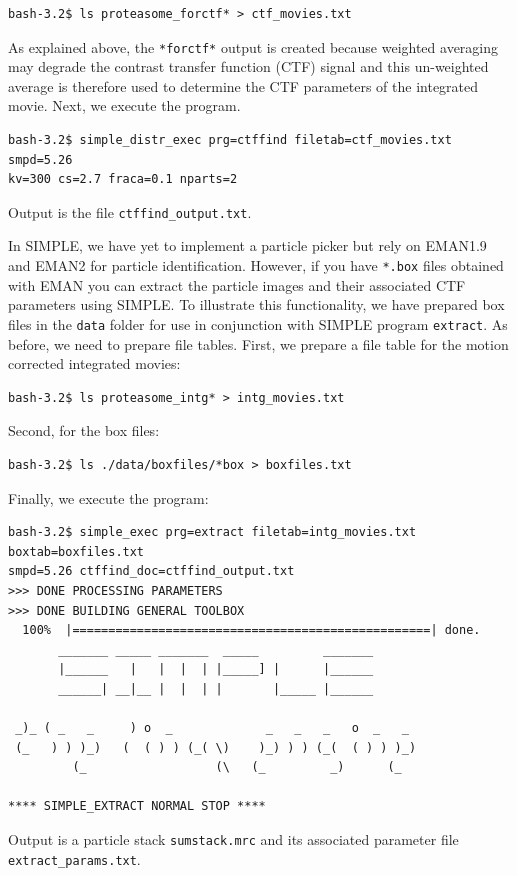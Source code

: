 \documentclass[a4paper,11pt]{article}
\newcommand{\prgname}[1]{\textcolor{NavyBlue}{\texttt{#1}}}
\begin{document}
\begin{verbatim}
bash-3.2$ ls proteasome_forctf* > ctf_movies.txt
\end{verbatim}
As explained above, the \texttt{*forctf*} output is created because weighted averaging may degrade the contrast transfer function (CTF) signal and this un-weighted average is therefore used to determine the CTF parameters of the integrated movie. Next, we execute the program.
\begin{verbatim}
bash-3.2$ simple_distr_exec prg=ctffind filetab=ctf_movies.txt smpd=5.26
kv=300 cs=2.7 fraca=0.1 nparts=2
\end{verbatim}
Output is the file \texttt{ctffind\_output.txt}.

In SIMPLE, we have yet to implement a particle picker but rely on EMAN1.9 and EMAN2 for particle identification. However, if you have \texttt{*.box} files obtained with EMAN you can extract the particle images and their associated CTF parameters using SIMPLE. To illustrate this functionality, we have prepared box files in the \texttt{data} folder for use in conjunction with SIMPLE program \prgname{extract}. As before, we need to prepare file tables. First, we prepare a file table for the motion corrected integrated movies:
\begin{verbatim}
bash-3.2$ ls proteasome_intg* > intg_movies.txt
\end{verbatim}
Second, for the box files:
\begin{verbatim}
bash-3.2$ ls ./data/boxfiles/*box > boxfiles.txt
\end{verbatim}
Finally, we execute the program:
\begin{verbatim}
bash-3.2$ simple_exec prg=extract filetab=intg_movies.txt boxtab=boxfiles.txt
smpd=5.26 ctffind_doc=ctffind_output.txt 
>>> DONE PROCESSING PARAMETERS
>>> DONE BUILDING GENERAL TOOLBOX
  100%  |==================================================| done.
       _______ _____ _______  _____         _______
       |______   |   |  |  | |_____] |      |______
       ______| __|__ |  |  | |       |_____ |______
 
 _)_ ( _   _     ) o  _             _   _   _   o  _   _
 (_   ) ) )_)   (  ( ) ) (_( \)    )_) ) ) (_(  ( ) ) )_)
         (_                  (\   (_         _)      (_

**** SIMPLE_EXTRACT NORMAL STOP ****
\end{verbatim}
Output is a particle stack \texttt{sumstack.mrc} and its associated parameter file \texttt{extract\_params.txt}.
\end{document}
